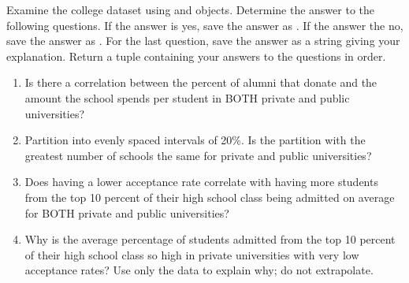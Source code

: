\begin{problem}
Examine the college dataset using  and  objects.
Determine the answer to the following questions.
If the answer is yes, save the answer as .
If the answer the no, save the answer as .
For the last question, save the answer as a string giving your explanation.
Return a tuple containing your answers to the questions in order.

\begin{enumerate}
\item Is there a correlation between the percent of alumni that donate and the amount the school spends per student in BOTH private and public universities?

\item Partition  into evenly spaced intervals of 20\%.
Is the partition with the greatest number of schools the same for private and public universities?

\item Does having a lower acceptance rate correlate with having more students from the top 10 percent of their high school class being admitted on average for BOTH private and public universities?

\item Why is the average percentage of students admitted from the top 10 percent of their high school class so high in private universities with very low acceptance rates? Use only the data to explain why; do not extrapolate.
\end{enumerate}
\end{problem}





